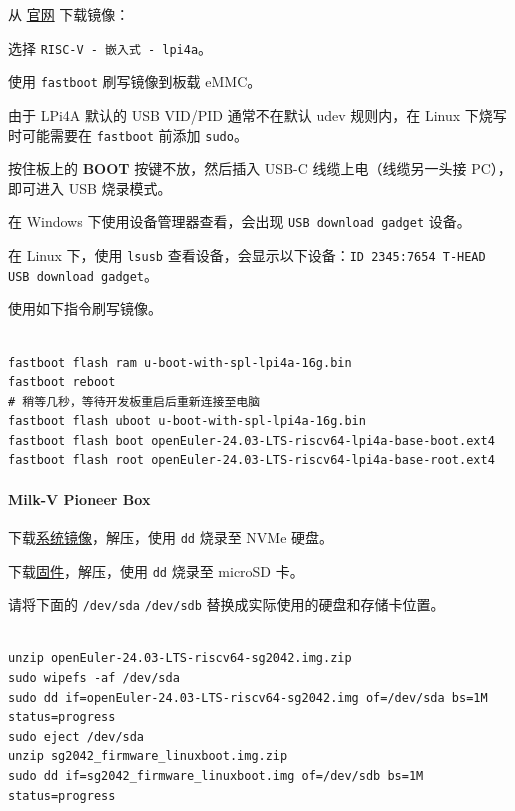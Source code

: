 \documentclass{article}
\begin{document}
从 \href{https://www.openeuler.org/zh/download/?version=openEuler%2024.03%20LTS}{官网} 下载镜像：

选择 \verb|RISC-V - 嵌入式 - lpi4a|。

使用 \verb|fastboot| 刷写镜像到板载 eMMC。

由于 LPi4A 默认的 USB VID/PID 通常不在默认 udev 规则内，在 Linux 下烧写时可能需要在 \verb|fastboot| 前添加 \verb|sudo|。

按住板上的 \textbf{BOOT} 按键不放，然后插入 USB-C 线缆上电（线缆另一头接 PC），即可进入 USB 烧录模式。

在 Windows 下使用设备管理器查看，会出现 \verb|USB download gadget| 设备。

在 Linux 下，使用 \verb|lsusb| 查看设备，会显示以下设备：\verb|ID 2345:7654 T-HEAD USB download gadget|。

使用如下指令刷写镜像。

\begin{verbatim}
  
fastboot flash ram u-boot-with-spl-lpi4a-16g.bin
fastboot reboot
# 稍等几秒，等待开发板重启后重新连接至电脑
fastboot flash uboot u-boot-with-spl-lpi4a-16g.bin
fastboot flash boot openEuler-24.03-LTS-riscv64-lpi4a-base-boot.ext4
fastboot flash root openEuler-24.03-LTS-riscv64-lpi4a-base-root.ext4

\end{verbatim}

\paragraph{Milk-V Pioneer Box}
下载\href{https://mirrors.hust.edu.cn/openeuler/openEuler-24.03-LTS/embedded_img/riscv64/SG2042/openEuler-24.03-LTS-riscv64-sg2042.img.zip}{系统镜像}，解压，使用 \verb|dd| 烧录至 NVMe 硬盘。

下载\href{https://mirrors.hust.edu.cn/openeuler/openEuler-24.03-LTS/embedded_img/riscv64/SG2042/sg2042_firmware_linuxboot.img.zip}{固件}，解压，使用 \verb|dd| 烧录至 microSD 卡。

请将下面的 \verb|/dev/sda| \verb|/dev/sdb| 替换成实际使用的硬盘和存储卡位置。

\begin{verbatim}
  
unzip openEuler-24.03-LTS-riscv64-sg2042.img.zip
sudo wipefs -af /dev/sda
sudo dd if=openEuler-24.03-LTS-riscv64-sg2042.img of=/dev/sda bs=1M status=progress
sudo eject /dev/sda
unzip sg2042_firmware_linuxboot.img.zip
sudo dd if=sg2042_firmware_linuxboot.img of=/dev/sdb bs=1M status=progress

\end{verbatim}
\end{document}
